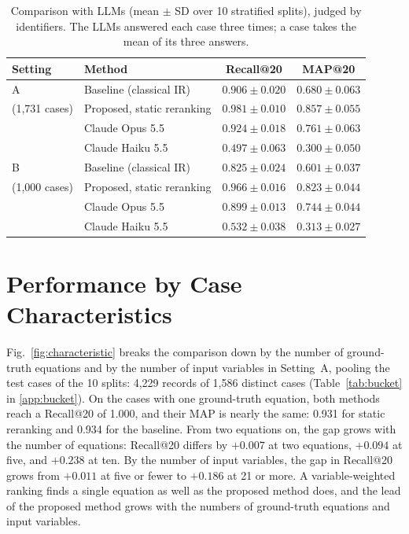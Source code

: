 \begin{table}[h]\centering
\caption{Comparison with LLMs (mean $\pm$ SD over 10 stratified splits), judged by identifiers. The
LLMs answered each case three times; a case takes the mean of its three answers.}
\label{tab:llm}
\footnotesize
\setlength{\tabcolsep}{4pt}
\begin{tabular}{llcc}
\toprule
Setting & Method & Recall@20 & MAP@20 \\
\midrule
A & Baseline (classical IR) & $0.906 \pm 0.020$ & $0.680 \pm 0.063$ \\
(1,731 cases) & Proposed, static reranking & $\mathbf{0.981 \pm 0.010}$ & $\mathbf{0.857 \pm 0.055}$ \\
 & Claude Opus 5.5 & $0.924 \pm 0.018$ & $0.761 \pm 0.063$ \\
 & Claude Haiku 5.5 & $0.497 \pm 0.063$ & $0.300 \pm 0.050$ \\
\midrule
B & Baseline (classical IR) & $0.825 \pm 0.024$ & $0.601 \pm 0.037$ \\
(1,000 cases) & Proposed, static reranking & $\mathbf{0.966 \pm 0.016}$ & $\mathbf{0.823 \pm 0.044}$ \\
 & Claude Opus 5.5 & $0.899 \pm 0.013$ & $0.744 \pm 0.044$ \\
 & Claude Haiku 5.5 & $0.532 \pm 0.038$ & $0.313 \pm 0.027$ \\
\bottomrule
\end{tabular}
\end{table}

\section{Performance by Case Characteristics}
\label{sec:bycharacteristics}

Fig.~\ref{fig:characteristic} breaks the comparison down by the number of ground-truth equations
and by the number of input variables in Setting~A, pooling the test cases of the 10 splits: 4,229
records of 1,586 distinct cases (Table~\ref{tab:bucket} in \ref{app:bucket}). On the
cases with one ground-truth equation, both methods reach a Recall@20 of 1.000, and their MAP is
nearly the same: 0.931 for static reranking and 0.934 for the baseline. From two equations on, the
gap grows with the number of equations: Recall@20 differs by $+0.007$ at two equations, $+0.094$
at five, and $+0.238$ at ten. By the number of input variables, the gap in Recall@20 grows from
$+0.011$ at five or fewer to $+0.186$ at 21 or more. A variable-weighted ranking finds a single
equation as well as the proposed method does, and the lead of the proposed method grows with the
numbers of ground-truth equations and input variables.

